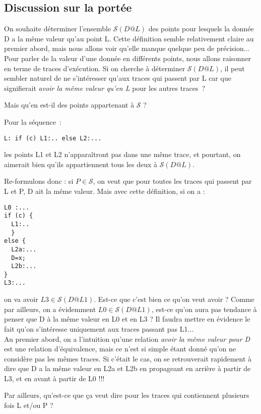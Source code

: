 \documentclass[a4paper,twoside]{article}
\renewcommand{\sc}{\mathcal{S}}
\begin{document}
\subsection{Discussion sur la portée}

On souhaite déterminer l'ensemble $\sc(D@L)$ des points 
pour lesquels la donnée D a la même valeur qu'au point L.
Cette définition semble relativement claire au premier abord,
mais nous allons voir qu'elle manque quelque peu de précision...\\

Pour parler de la valeur d'une donnée en différents points,
nous allons raisonner en terme de traces d'exécution.
Si on cherche à déterminer $\sc(D@L)$, 
il peut sembler naturel de ne s'intéresser qu'aux traces qui passent par L
car que signifierait {\it avoir la même valeur qu'en L} pour les autres traces~?

Mais qu'en est-il des points appartenant à $\sc$ ?

Pour la séquence~: 

\centerline{\verb!L: if (c) L1:.. else L2:...!}

les points L1 et L2 n'apparaîtront pas dans une même trace, et pourtant,
on aimerait bien qu'ils appartiennent tous les deux à $\sc(D@L)$.

Re-formulons donc : si $P \in \sc$, on veut que pour toutes les traces qui passent
par L et P, D ait la même valeur.
Mais avec cette définition, si on a :

\begin{verbatim}
L0 :... 
if (c) { 
  L1:.. 
  } 
else { 
  L2a:... 
  D=x; 
  L2b:... 
} 
L3:...
\end{verbatim}

on va avoir $L3 \in \sc(D@L1)$. Est-ce que c'est bien ce qu'on veut avoir ?
Comme par ailleurs, on a évidemment $L0 \in \sc(D@L1)$, est-ce qu'on aura pas
tendance à penser que D à la même valeur en L0 et en L3 ?
Il faudra mettre en évidence le fait qu'on s'intéresse uniquement 
aux traces passant pas L1...\\
 
Au premier abord, on a l'intuition qu'une relation 
{\it avoir la même valeur pour D} est une relation d'équivalence, mais ce n'est
si simple étant donné qu'on
ne considère pas les mêmes traces. Si c'était le cas, on se retrouverait
rapidement à dire que D a la même valeur en L2a et L2b en propageant en
arrière à partir de L3, et en avant à partir de L0 !!!

Par ailleurs, qu'est-ce que ça veut dire pour les traces 
qui contiennent plusieurs fois L et/ou P ?
\end{document}
